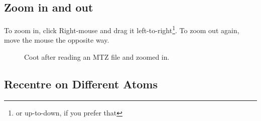 \documentclass{article}
\begin{document}
\subsection{Zoom in and out}
To zoom in, click Right-mouse and drag it left-to-right\footnote{or
  up-to-down, if you prefer that}. To zoom out again, move the mouse
the opposite way.

\begin{figure}[htbp]
  \begin{center}
    \leavevmode
    \epsfxsize 70mm
    \caption{Coot after reading an MTZ file and zoomed in.}
    \label{fig:map_screenshot}
  \end{center}
\end{figure}

\subsection {Recentre on Different Atoms}
\end{document}
